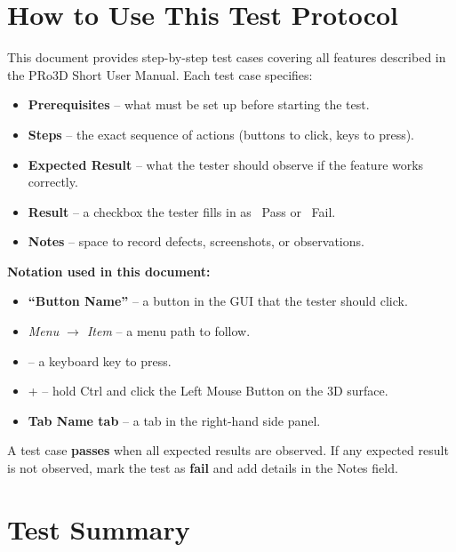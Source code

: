 \documentclass[a4paper,11pt]{article}
\newcommand{\testpass}{\textcolor{passgreen}{\ding{51}~Pass}}
\newcommand{\testfail}{\textcolor{failred}{\ding{55}~Fail}}
\newcommand{\key}[1]{\fbox{\texttt{#1}}}
\newcommand{\button}[1]{\textbf{``#1''}}
\newcommand{\menu}[1]{\textit{#1}}
\newcommand{\tab}[1]{\textbf{#1 tab}}
\begin{document}
	\section*{How to Use This Test Protocol}
	
	This document provides step-by-step test cases covering all features described in the PRo3D Short User Manual.
	Each test case specifies:
	\begin{itemize}
		\item \textbf{Prerequisites} -- what must be set up before starting the test.
		\item \textbf{Steps} -- the exact sequence of actions (buttons to click, keys to press).
		\item \textbf{Expected Result} -- what the tester should observe if the feature works correctly.
		\item \textbf{Result} -- a checkbox the tester fills in as \testpass{} or \testfail{}.
		\item \textbf{Notes} -- space to record defects, screenshots, or observations.
	\end{itemize}
	
	\noindent\textbf{Notation used in this document:}
	\begin{itemize}
		\item \button{Button Name} -- a button in the GUI that the tester should click.
		\item \menu{Menu $\rightarrow$ Item} -- a menu path to follow.
		\item \key{KEY} -- a keyboard key to press.
		\item \key{CTRL}+\key{LMB} -- hold Ctrl and click the Left Mouse Button on the 3D surface.
		\item \tab{Tab Name} -- a tab in the right-hand side panel.
	\end{itemize}
	
	\noindent A test case \textbf{passes} when all expected results are observed. If any expected result is not observed, mark the test as \textbf{fail} and add details in the Notes field.
	
	\newpage
	
	\section*{Test Summary}
	\label{sec:summary}
	
\end{document}
